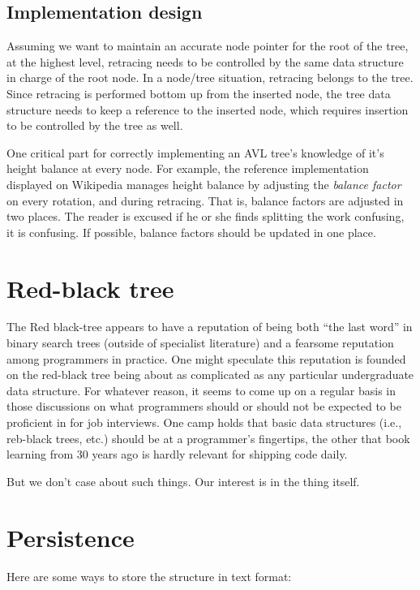 \documentclass{article}
\begin{document}
\subsection{Implementation design}

Assuming we want to maintain an accurate node pointer for the root of the tree,
at the highest level, retracing needs to be controlled by the same data
structure in charge of the root node. In a node/tree situation, retracing
belongs to the tree. Since retracing is performed bottom up from the
inserted node, the tree data structure needs to keep a reference to
the inserted node, which requires insertion to be controlled by the
tree as well.

One critical part for correctly implementing an AVL tree's knowledge of
it's height balance at every node. For example, the reference implementation
displayed on Wikipedia manages height balance by adjusting the
\textit{balance factor} on every rotation, and during retracing. That is,
balance factors are adjusted in two places. The reader is excused if
he or she finds splitting the work confusing, it is confusing. If possible,
balance factors should be updated in one place.

\section{Red-black tree}

The Red black-tree appears to have a reputation of being both ``the last word''
in binary search trees (outside of specialist literature) and a fearsome
reputation among programmers in practice. One might speculate this reputation
is founded on the red-black tree being about as complicated as any particular
undergraduate data structure. For whatever reason, it seems to come up on a
regular basis in those discussions on what programmers should or should not be
expected to be proficient in for job interviews. One camp holds that basic data
structures (i.e., reb-black trees, etc.) should be at a programmer's
fingertips, the other that book learning from 30 years ago is hardly relevant
for shipping code daily.

But we don't case about such things. Our interest is in the thing itself.


\section{Persistence}

Here are some ways to store the structure in text format:
\end{document}
